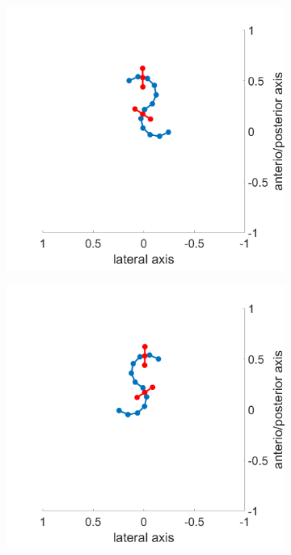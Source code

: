 \documentclass[a4paper]{scrartcl}
\begin{document}
{\begin{figure}
 \centering
 \begin{subfigure}[b]{0.45\linewidth}
  \centering
  \includegraphics[width=\textwidth]{Figures/figure2Ba.png}
  \caption{\label{fig:right_bend}}
 \end{subfigure}
 \begin{subfigure}[b]{0.45\linewidth}
  \centering
  \includegraphics[width=\textwidth]{Figures/figure2Bb.png}

\end{subfigure}
\end{figure}}
\end{document}
